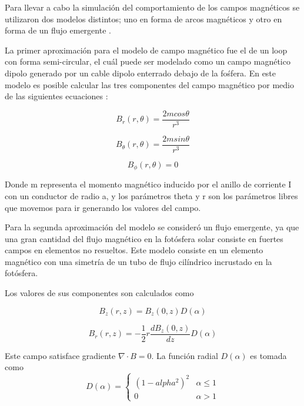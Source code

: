 \documentclass[9pt]{book}
\begin{document}
Para llevar a cabo la simulaci\'on del comportamiento de los campos magn\'eticos se utilizaron dos modelos distintos; uno en forma de arcos magn\'eticos \cite{loops} y otro en forma de un flujo emergente \cite{flujoemergente}.

La primer aproximaci\'on para el modelo de campo magn\'etico fue el de un loop con forma semi-circular, el cu\'al puede ser modelado como un campo magn\'etico dipolo generado por un cable dipolo enterrado debajo de la fo\'sfera.
En este modelo es posible calcular las tres componentes del campo magn\'etico por medio de las siguientes ecuaciones :

\begin{equation}
    B_r(r,\theta)=\frac{2mcos\theta}{r^3}
\end{equation}
  
\begin{equation}
    B_\theta(r,\theta)=\frac{2msin\theta}{r^3}
\end{equation}

\begin{equation}
    B_\phi(r,\theta)=0
\end{equation}

Donde m representa el momento magn\'etico inducido por el anillo de corriente I con un conductor de radio a, y los par\'ametros theta y r son los par\'ametros libres que movemos para ir generando los valores del campo.

Para la segunda aproximaci\'on del modelo se consider\'o un flujo emergente, ya que una gran cantidad del flujo magn\'etico en la fot\'osfera solar consiste en fuertes campos en elementos no resueltos. Este modelo consiste en un elemento magn\'etico con una simetr\'ia de un tubo de flujo cil\'indrico incrustado en la fot\'osfera.

Los valores de sus componentes son calculados como

\begin{equation}
B_z(r,z)=B_z(0,z)D(\alpha)
\end{equation}

\begin{equation}
B_r(r,z)=-\frac{1}{2}r\frac{dB_z(0,z)}{dz}D(\alpha)
\end{equation}

Este campo satisface gradiente $ \nabla \cdot B = 0 $. La funci\'on radial $D(\alpha)$ es tomada como
\begin{equation}
 D(\alpha) = 
    \begin{cases}
        (1-alpha^2)^2 & \alpha \leq 1 \\
        0   & \alpha > 1
    \end{cases}
\end{equation}
\end{document}
